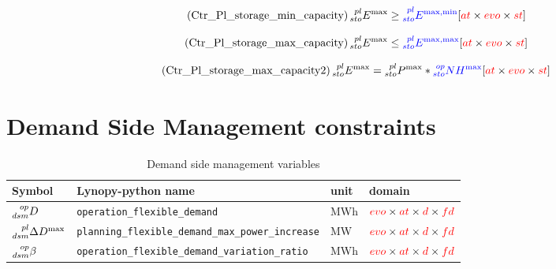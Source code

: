 \documentclass[a4paper,11pt]{article}
\begin{document}
\begin{equation} \tag{Ctr\_Pl\_storage\_min\_capacity}
   \prescript{pl}{sto}{E^{\max}}  \geq  \textcolor{blue}{\prescript{pl}{sto}{E^{\max,\min}}} \hfill [\textcolor{red}{at} \times \textcolor{red}{evo} \times \textcolor{red}{st}]
\label{eq:Ctr_Pl_storage_min_capacity}
\end{equation}

\begin{equation} \tag{Ctr\_Pl\_storage\_max\_capacity}
   \prescript{pl}{sto}{E^{\max}}  \leq  \textcolor{blue}{\prescript{pl}{sto}{E^{\max,\max}}} \hfill [\textcolor{red}{at} \times \textcolor{red}{evo} \times \textcolor{red}{st}]
\label{eq:Ctr_Pl_storage_max_capacity}
\end{equation}

\begin{equation} \tag{Ctr\_Pl\_storage\_max\_capacity2}
  \prescript{pl}{sto}{E^{\max}} = \prescript{pl}{sto}{P^{\max}}  * \textcolor{blue}{\prescript{op}{sto}{NH^{\max}}} \hfill [\textcolor{red}{at} \times \textcolor{red}{evo} \times \textcolor{red}{st}]
\label{eq:Ctr_Pl_storage_max_capacity2}
\end{equation}


\newpage

\section{Demand Side Management constraints}

\begin{table}[h]
\footnotesize
  \centering
    \caption{Demand side management  variables}
  \begin{tabular}{llll}
    \hline
    \textbf{Symbol} & \textbf{Lynopy-python name} & \textbf{unit}  & \textbf{domain} \\ \hline
    
    $\prescript{op}{dsm}{D}$ & \verb|operation_flexible_demand| & MWh & $\textcolor{red}{evo} \times \textcolor{red}{at} \times \textcolor{red}{d} \times \textcolor{red}{fd}$ \\ 
    
    $\prescript{pl}{dsm}{\Delta D^{\max}}$ & \verb|planning_flexible_demand_max_power_increase| & MW & $\textcolor{red}{evo} \times \textcolor{red}{at} \times \textcolor{red}{d} \times \textcolor{red}{fd}$ \\ 

    $\prescript{op}{dsm}{\beta}$ & \verb|operation_flexible_demand_variation_ratio| & MWh & $\textcolor{red}{evo} \times \textcolor{red}{at} \times \textcolor{red}{d} \times \textcolor{red}{fd}$ \\ 

  \end{tabular}
\end{table}
\end{document}

